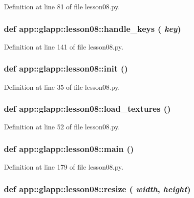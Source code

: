 Definition at line 81 of file lesson08.py.
\subsubsection{\setlength{\rightskip}{0pt plus 5cm}def app::glapp::lesson08::handle\_\-keys ( {\em key})}\label{namespaceapp_1_1glapp_1_1lesson08_9c8d491f523160c81e69675259911ebc}




Definition at line 141 of file lesson08.py.
\subsubsection{\setlength{\rightskip}{0pt plus 5cm}def app::glapp::lesson08::init ()}\label{namespaceapp_1_1glapp_1_1lesson08_d786002f5a901618283560443d9b8b73}




Definition at line 35 of file lesson08.py.
\subsubsection{\setlength{\rightskip}{0pt plus 5cm}def app::glapp::lesson08::load\_\-textures ()}\label{namespaceapp_1_1glapp_1_1lesson08_e02f44ec95a172e6103b792170c01ef2}




Definition at line 52 of file lesson08.py.
\subsubsection{\setlength{\rightskip}{0pt plus 5cm}def app::glapp::lesson08::main ()}\label{namespaceapp_1_1glapp_1_1lesson08_5ea84fd6725611c553648f4152176cc2}




Definition at line 179 of file lesson08.py.
\subsubsection{\setlength{\rightskip}{0pt plus 5cm}def app::glapp::lesson08::resize ( {\em width},  {\em height})}\label{namespaceapp_1_1glapp_1_1lesson08_b8a676b98d31103bb927bae382568f22}




